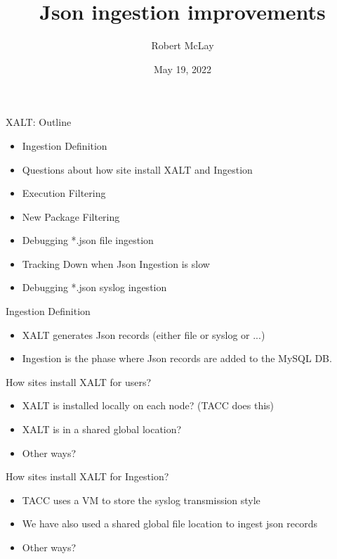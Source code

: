 \documentclass{beamer}
\begin{document}
\title[XALT]{Json ingestion improvements}
\author{Robert McLay}
\date{May 19, 2022}

\frame{\titlepage}

\begin{frame}{XALT: Outline}
  \begin{itemize}
    \item Ingestion Definition
    \item Questions about how site install XALT and Ingestion
    \item Execution Filtering
    \item New Package Filtering
    \item Debugging *.json file ingestion
    \item Tracking Down when Json Ingestion is slow
    \item Debugging *.json syslog ingestion
  \end{itemize}
\end{frame}

\begin{frame}{Ingestion Definition}
  \begin{itemize}
    \item XALT generates Json records (either file or syslog or ...)
    \item Ingestion is the phase where Json records are added to the
      MySQL DB.
  \end{itemize}
\end{frame}

\begin{frame}{How sites install XALT for users?}
  \begin{itemize}
    \item XALT is installed locally on each node? (TACC does this)
    \item XALT is in a shared global location?
    \item Other ways?
  \end{itemize}
\end{frame}

\begin{frame}{How sites install XALT for Ingestion?}
  \begin{itemize}
    \item TACC uses a VM to store the syslog transmission style
    \item We have also used a shared global file location to ingest
      json records
    \item Other ways?
  \end{itemize}
\end{frame}
\end{document}
